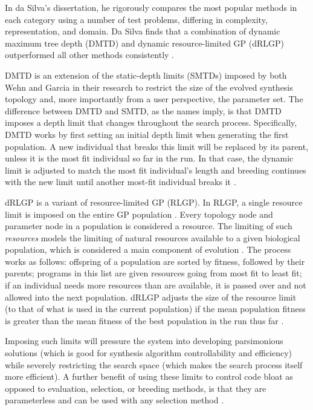 \documentclass[12pt]{report} 	%
\numberwithin{figure}{chapter}
\numberwithin{table}{chapter}
\numberwithin{equation}{chapter}
\begin{document}
\begin{flushleft}
In da Silva's dissertation, he rigorously compares the most popular methods in each category using a number of test problems, differing in complexity, representation, and domain. Da Silva finds that a combination of dynamic maximum tree depth (DMTD) and dynamic resource-limited GP (dRLGP) outperformed all other methods consistently \cite[p. 86]{Silva:2008le}. 

DMTD is an extension of the static-depth limits (SMTDs) imposed by both Wehn \cite{Wehn:1998bh} and Garcia  \cite{Garcia:2002cq} in their research to restrict the size of the evolved synthesis topology and, more importantly from a user perspective, the parameter set. The difference between DMTD and SMTD, as the names imply, is that DMTD imposes a depth limit that changes throughout the search process. Specifically, DMTD works by first setting an initial depth limit when generating the first population. A new individual that breaks this limit will be replaced by its parent, unless it is the most fit individual so far in the run. In that case, the dynamic limit is adjusted to match the most fit individual's length and breeding continues with the new limit until another most-fit individual breaks it \cite[p. 17]{Silva:2008le}.

dRLGP is a variant of resource-limited GP (RLGP). In RLGP, a single resource limit is imposed on the entire GP population \cite[p. 21]{Silva:2008le}. Every topology node and parameter node in a population is considered a resource. The limiting of such \textit{resources} models the limiting of natural resources available to a given biological population, which is considered a main component of evolution \cite[p. 21]{Silva:2008le}. The process works as follows: offspring of a population are sorted by fitness, followed by their parents; programs in this list are given resources going from most fit to least fit; if an individual needs more resources than are available, it is passed over and not allowed into the next population. dRLGP adjusts the size of the resource limit (to that of what is used in the current population) if the mean population fitness is greater than the mean fitness of the best population in the run thus far \cite[p. 22]{Silva:2008le}. 

Imposing such limits will pressure the system into developing parsimonious solutions (which is good for synthesis algorithm controllability and efficiency) while severely restricting the search space (which makes the search process itself more efficient). A further benefit of using these limits to control code bloat as opposed to evaluation, selection, or breeding methods, is that they are parameterless and can be used with any selection method \cite[p. 97]{Silva:2008le}.


\end{flushleft}
\end{document}
